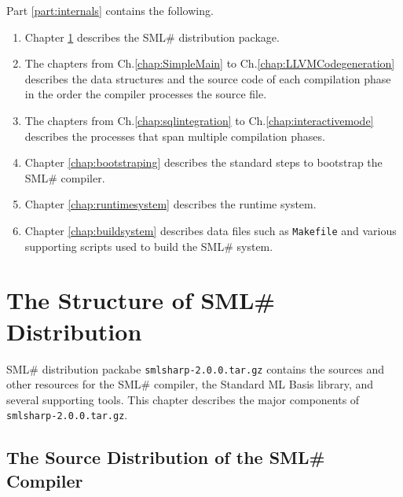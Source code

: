 \documentclass{jbook}
\newif\ifjp
\newcommand{\txt}[2]{#2}
\newcommand{\smlsharp}{SML\#}
\newcommand{\code}[1]{\mbox{\large\tt #1}}
\begin{document}
	Part \ref{part:internals} contains the following.
\begin{enumerate}
\item Chapter \ref{chap:package} describes the \smlsharp{} distribution
package.
\item 
      The chapters from Ch.\ref{chap:SimpleMain} to
Ch.\ref{chap:LLVMCodegeneration} describes the data structures and the
source code of each compilation phase in the order the compiler
processes  the source file.
\item 
	The chapters from Ch.\ref{chap:sqlintegration} to
Ch.\ref{chap:interactivemode} describes the processes that span
multiple compilation phases.
\item Chapter \ref{chap:bootstraping} describes the standard steps to
bootstrap the \smlsharp{} compiler.
\item 
	Chapter \ref{chap:runtimesystem} describes the runtime system.
\item 
	Chapter \ref{chap:buildsystem} describes data files such as
\code{Makefile} and various supporting scripts used to build the
\smlsharp{} system. 
\end{enumerate}
\fi%


% 
\chapter{\txt{\smlsharp{}パッケージの構造}{The Structure of \smlsharp{} Distribution}}
\label{chap:package}

\ifjp%
	\smlsharp{}配布パッケージ\code{smlsharp-2.0.0.tar.gz}は，
\smlsharp{}コンパイラ，基本ライブラリ，サポートツールのソースを含む．
	本章では，\code{smlsharp-2.0.0.tar.gz}の構造を記述する．
\else%
	\smlsharp{} distribution packabe \code{smlsharp-2.0.0.tar.gz}
contains the sources and other resources for the \smlsharp{} compiler,
the Standard ML Basis library, and several supporting tools.
	This chapter describes the major components of
\code{smlsharp-2.0.0.tar.gz}.
\fi%

\section{\txt
{\smlsharp{}ソースパッケージの構成}
{The Source Distribution of the \smlsharp{} Compiler}
}
\end{document}

